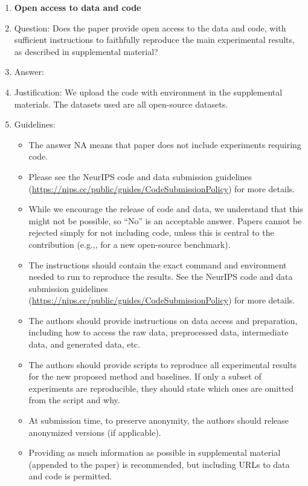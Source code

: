 \documentclass{article}
\theoremstyle{plain}
\theoremstyle{definition}
\theoremstyle{remark}
\begin{document}
\begin{enumerate}
\item {\bf Open access to data and code}
    \item[] Question: Does the paper provide open access to the data and code, with sufficient instructions to faithfully reproduce the main experimental results, as described in supplemental material?
    \item[] Answer: \answerYes{} %
    \item[] Justification: We upload the code with environment in the supplemental materials. The datasets used are all open-source datasets.
    \item[] Guidelines:
    \begin{itemize}
        \item The answer NA means that paper does not include experiments requiring code.
        \item Please see the NeurIPS code and data submission guidelines (\url{https://nips.cc/public/guides/CodeSubmissionPolicy}) for more details.
        \item While we encourage the release of code and data, we understand that this might not be possible, so “No” is an acceptable answer. Papers cannot be rejected simply for not including code, unless this is central to the contribution (e.g.,, for a new open-source benchmark).
        \item The instructions should contain the exact command and environment needed to run to reproduce the results. See the NeurIPS code and data submission guidelines (\url{https://nips.cc/public/guides/CodeSubmissionPolicy}) for more details.
        \item The authors should provide instructions on data access and preparation, including how to access the raw data, preprocessed data, intermediate data, and generated data, etc.
        \item The authors should provide scripts to reproduce all experimental results for the new proposed method and baselines. If only a subset of experiments are reproducible, they should state which ones are omitted from the script and why.
        \item At submission time, to preserve anonymity, the authors should release anonymized versions (if applicable).
        \item Providing as much information as possible in supplemental material (appended to the paper) is recommended, but including URLs to data and code is permitted.
    \end{itemize}



\end{enumerate}
\end{document}
